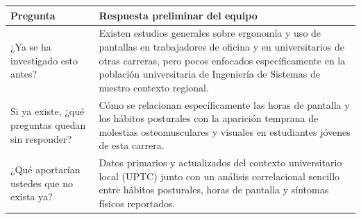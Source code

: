 \begin{center}
\begin{tabularx}{\textwidth}{L{5.5cm} X}
\toprule
\textbf{Pregunta} & \textbf{Respuesta preliminar del equipo}\\
\midrule
¿Ya se ha investigado esto antes? & Existen estudios generales sobre ergonomía y uso de pantallas en trabajadores de oficina y en universitarios de otras carreras, pero pocos enfocados específicamente en la población universitaria de Ingeniería de Sistemas de nuestro contexto regional.\\
Si ya existe, ¿qué preguntas quedan sin responder? & Cómo se relacionan específicamente las horas de pantalla y los hábitos posturales con la aparición temprana de molestias osteomusculares y visuales en estudiantes jóvenes de esta carrera.\\
¿Qué aportarían ustedes que no exista ya? & Datos primarios y actualizados del contexto universitario local (UPTC) junto con un análisis correlacional sencillo entre hábitos posturales, horas de pantalla y síntomas físicos reportados.\\
\bottomrule
\end{tabularx}
\end{center}
